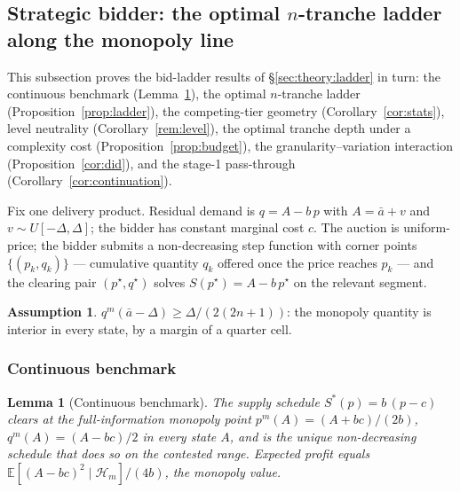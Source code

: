 \documentclass[11pt,a4paper]{article}
\newtheorem{lemma}{Lemma}
\theoremstyle{definition}
\newtheorem{assumption}{Assumption}
\theoremstyle{remark}
\theoremstyle{plain}
\begin{document}
\subsection{Strategic bidder: the optimal $n$-tranche ladder along the monopoly line}\label{app:tranche}

This subsection proves the bid-ladder results of \S\ref{sec:theory:ladder} in turn: the continuous benchmark (Lemma~\ref{lem:locus}), the optimal $n$-tranche ladder (Proposition~\ref{prop:ladder}), the competing-tier geometry (Corollary~\ref{cor:stats}), level neutrality (Corollary~\ref{rem:level}), the optimal tranche depth under a complexity cost (Proposition~\ref{prop:budget}), the granularity--variation interaction (Proposition~\ref{cor:did}), and the stage-1 pass-through (Corollary~\ref{cor:continuation}).

Fix one delivery product. Residual demand is $q = A - b\,p$ with $A = \bar a + v$ and $v \sim U[-\Delta, \Delta]$; the bidder has constant marginal cost $c$. The auction is uniform-price; the bidder submits a non-decreasing step function with corner points $\{(p_k, q_k)\}$ --- cumulative quantity $q_k$ offered once the price reaches $p_k$ --- and the clearing pair $(p^\star, q^\star)$ solves $S(p^\star) = A - b\,p^\star$ on the relevant segment.

\begin{assumption}\label{ass:interior}
$q^m(\bar a - \Delta) \ge \Delta/(2(2n+1))$: the monopoly quantity is interior in every state, by a margin of a quarter cell.
\end{assumption}


\subsubsection{Continuous benchmark}\label{app:tranche:locus}

\begin{lemma}[Continuous benchmark]\label{lem:locus}
The supply schedule $S^*(p) = b\,(p - c)$ clears at the full-information monopoly point $p^m(A) = (A + bc)/(2b)$, $q^m(A) = (A - bc)/2$ in every state $A$, and is the unique non-decreasing schedule that does so on the contested range. Expected profit equals $\mathbb{E}[(A - bc)^2 \mid \mathcal{H}_m]/(4b)$, the monopoly value.
\end{lemma}
\end{document}
